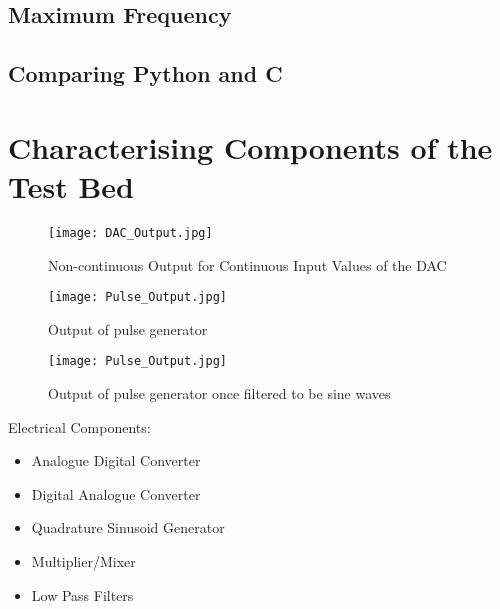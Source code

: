 \documentclass[../main.tex]{subfiles}
\begin{document}
\subsection{Maximum Frequency}


\subsection{Comparing Python and C} \label{sec_Comparing Python and C}


\section{Characterising Components of the Test Bed} \label{sec_Components}

\begin{figure}[ht]
	\centering
	\texttt{[image: DAC\_Output.jpg]}
	\caption{Non-continuous Output for Continuous Input Values of the DAC}
\end{figure}

\begin{figure}[ht]
	\centering
	\texttt{[image: Pulse\_Output.jpg]}
	\caption{Output of pulse generator}
\end{figure}

\begin{figure}[ht]
	\centering
	\texttt{[image: Pulse\_Output.jpg]}
	\caption{Output of pulse generator once filtered to be sine waves}
\end{figure}



Electrical Components:
\begin{itemize}
	\item Analogue Digital Converter
	\item Digital Analogue Converter
	\item Quadrature Sinusoid Generator
	\item Multiplier/Mixer
	\item Low Pass Filters
\end{itemize}
\end{document}
